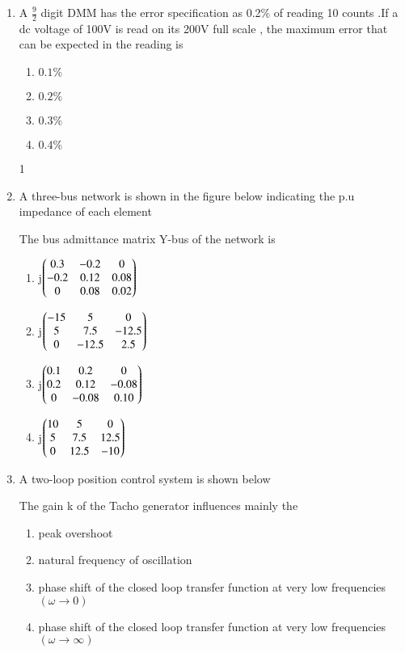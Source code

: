 \documentclass[journal]{IEEEtran}
\begin{document}
\begin{enumerate}
      


    \item A $\frac{9}{2}$ digit DMM has the error specification as 0.2\% of reading 10 counts .If a dc voltage of 100V is read on its 200V full scale , the maximum error that can be expected  in the reading is 
		\begin{multicols}{4}
			\begin{enumerate}
	\item $0.1 \%$
\item $0.2 \%$
\item $0.3 \%$
\item $0.4 \%$

	\end{enumerate}
		\end{multicols}{1}

 
    \item A three-bus network is shown in the figure below indicating the p.u impedance of each element
    
     
    \newpage
		The bus admittance matrix Y-bus of the network is 
			\begin{enumerate}
				
	\item j$\begin{pmatrix}0.3 & -0.2 & 0 \\ -0.2 & 0.12 & 0.08 \\ 0 & 0.08 & 0.02\end{pmatrix}$
\item j$\begin{pmatrix}-15 & 5 & 0 \\ 5 & 7.5 & -12.5\\ 0& -12.5 & 2.5\end{pmatrix}$
\item j$\begin{pmatrix}0.1 & 0.2 & 0 \\ 0.2 & 0.12 & -0.08\\ 0& -0.08 & 0.10\end{pmatrix}$
\item j$\begin{pmatrix}10& 5 & 0 \\ 5 & 7.5 & 12.5\\ 0& 12.5 & -10\end{pmatrix}$
			\end{enumerate}
		


    \item A two-loop position control system is shown below
    
    The  gain k of the Tacho generator influences mainly the 
    
            \begin{enumerate}
        \item peak overshoot
        \item natural frequency of oscillation
        \item phase shift of the closed loop transfer function at very low frequencies $(\omega \rightarrow 0)$
        \item phase shift of the closed loop transfer function at very low frequencies $(\omega \rightarrow \infty)$
        \end{enumerate}
      


\end{enumerate}
\end{document}
